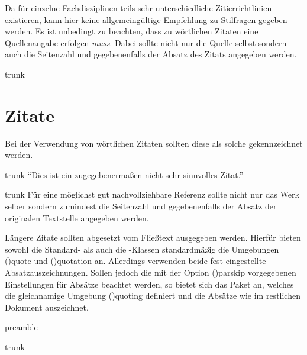 \documentclass[%
  english,ngerman,%
  cdgeometry=no,DIV=12,%
  cd=false,cdfont=false,cdtitle=true,%
  headings=normal,%
  automark,%
  listof=toc,%
]{tudscrartcl}
\begin{document}
Da für einzelne Fachdisziplinen teils sehr unterschiedliche Zitierrichtlinien 
existieren, kann hier keine allgemeingültige Empfehlung zu Stilfragen gegeben 
werden. Es ist unbedingt zu beachten, dass zu wörtlichen Zitaten eine 
Quellenangabe erfolgen \emph{muss}. Dabei sollte nicht nur die Quelle selbst 
sondern auch die Seitenzahl und gegebenenfalls der Absatz des Zitats angegeben 
werden.
%
\begin{refsection}
\begin{Code}[nolst]{trunk}
\section{Zitate}

Bei der Verwendung von wörtlichen Zitaten sollten diese als solche 
gekennzeichnet werden.
\end{Code}
\begin{Code}[input]{trunk}
\enquote{Dies ist ein zugegebenermaßen nicht sehr sinnvolles Zitat.}
\cite[58]{hanisch19}
\end{Code}
\begin{Code}[nolst]{trunk}
Für eine möglichst gut nachvollziehbare Referenz sollte nicht nur 
das Werk selber sondern zumindest die Seitenzahl und gegebenenfalls 
der Absatz der originalen Textstelle angegeben werden. 
\end{Code}

Längere Zitate sollten abgesetzt vom Fließtext ausgegeben werden. Hierfür 
bieten sowohl die Standard- als auch die \KOMAScript-Klassen standardmäßig 
die Umgebungen \Environment(){quote} und 
\Environment(){quotation} an. Allerdings verwenden beide 
fest eingestellte Absatzauszeichnungen. Sollen jedoch die mit der Option 
\Option(){parskip} vorgegebenen Einstellungen für Absätze 
beachtet werden, so bietet sich das Paket  an, welches die 
gleichnamige Umgebung \Environment(){quoting} definiert und 
die Absätze wie im restlichen Dokument auszeichnet.
%
\begin{Code}{preamble}
\usepackage{quoting}

\end{Code}

\begin{Code}[input]{trunk}
\end{Code}
\end{refsection}
\end{document}
